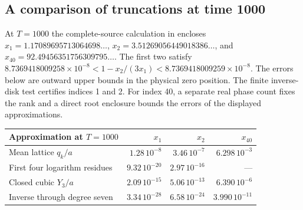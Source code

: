 \subsection{A comparison of truncations at time 1000}
At \(T=1000\) the complete-source calculation in \cite[\S6]{Founding08} encloses \(x_1=1.17089695713064698\ldots\), \(x_2=3.51269056449018386\ldots\), and \(x_{40}=92.49456351756309795\ldots\). The first two satisfy \(8.7369418009258\times10^{-8}<1-x_2/(3x_1)<8.7369418009259\times10^{-8}\). The errors below are outward upper bounds in the physical zero position. The finite inverse-disk test certifies indices 1 and 2. For index 40, a separate real phase count fixes the rank and a direct root enclosure bounds the errors of the displayed approximations.
\begin{center}
\begin{tabular}{@{}lrrr@{}}
\toprule
Approximation at \(T=1000\)&\(x_1\)&\(x_2\)&\(x_{40}\)\\
\midrule
Mean lattice \(q_k/a\)&\(1.28\,10^{-8}\)&\(3.46\,10^{-7}\)&\(6.298\,10^{-3}\)\\
First four logarithm residues&\(9.32\,10^{-20}\)&\(2.97\,10^{-16}\)&---\\
Closed cubic \(Y_3/a\)&\(2.09\,10^{-15}\)&\(5.06\,10^{-13}\)&\(6.390\,10^{-6}\)\\
Inverse through degree seven&\(3.34\,10^{-28}\)&\(6.58\,10^{-24}\)&\(3.990\,10^{-11}\)\\
\bottomrule
\end{tabular}
\end{center}
